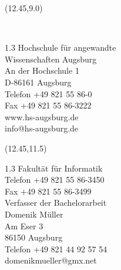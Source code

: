 \begin{textblock}{5}(12.45,9.0)
	\scriptsize
	\textcolor[rgb]{1,0,0}{\\
		\begin{flushleft}
			\begin{spacing} {1.3}
				Hochschule f\"ur angewandte\\
				Wissenschaften Augsburg\\
				\vspace{4pt}
				An der Hochschule 1\\
				D-86161 Augsburg\\
				\vspace{4pt}
				Telefon +49 821 55 86-0\\
				Fax +49 821 55 86-3222\\
				www.hs-augsburg.de\\
				info@hs-augsburg.de
			\end{spacing}
		\end{flushleft}
		}
\end{textblock}


\begin{textblock}{5}(12.45,11.5)
	\scriptsize
		\begin{flushleft}
			\begin{spacing} {1.3}
				Fakult\"at f\"ur Informatik\\
				Telefon +49 821 55 86-3450\\
				Fax \hspace{10pt} +49 821 55 86-3499\\
				\vspace{6pt}
				Verfasser der Bachelorarbeit\\
				Domenik Müller\\
				Am Eser 3\\
				86150 Augsburg\\
				Telefon +49 821 44 92 57 54\\
				domenikmueller@gmx.net\\
			\end{spacing}
		\end{flushleft}
	\end{textblock}
\pagebreak
